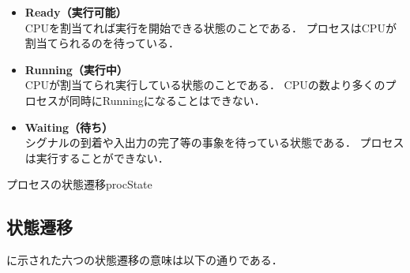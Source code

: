 \begin{itemize}
\item {\bf Ready（実行可能）} \\
CPUを割当てれば実行を開始できる状態のことである．
プロセスはCPUが割当てられるのを待っている．
\item {\bf Running（実行中）} \\
CPUが割当てられ実行している状態のことである．
CPUの数より多くのプロセスが同時にRunningになることはできない．
\item {\bf Waiting（待ち）} \\
シグナルの到着や入出力の完了等の事象を待っている状態である．
プロセスは実行することができない．
\end{itemize}

{プロセスの状態遷移}{procState}

\subsection{状態遷移}
に示された六つの状態遷移の意味は以下の通りである．

